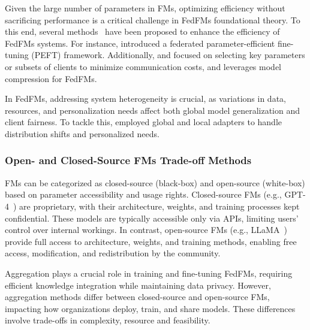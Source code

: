 Given the large number of parameters in FMs, optimizing efficiency without sacrificing performance is a critical challenge in FedFMs foundational theory. To this end, several methods~\cite{wu2024fedbiot,su2024titanic,yue2023fedjudge} have been proposed to enhance the efficiency of FedFMs systems. For instance, \citet{kuang2024federatedscope} introduced a federated parameter-efficient fine-tuning (PEFT) framework. Additionally, \citet{yue2023fedjudge} and \citet{su2024titanic} focused on selecting key parameters or subsets of clients to minimize communication costs, and \citet{wu2024fedbiot} leverages model compression for FedFMs.


In FedFMs, addressing system heterogeneity is crucial, as variations in data, resources, and personalization needs affect both global model generalization and client fairness. To tackle this, \citet{6-data-feddpa} employed global and local adapters to handle distribution shifts and personalized needs.

\subsubsection{Open- and Closed-Source FMs Trade-off Methods}

FMs can be categorized as closed-source (black-box) and open-source (white-box) based on parameter accessibility and usage rights. Closed-source FMs (e.g., GPT-4~\cite{OpenAI_GPT4_2023}) are proprietary, with their architecture, weights, and training processes kept confidential. These models are typically accessible only via APIs, limiting users' control over internal workings. In contrast, open-source FMs (e.g., LLaMA~\cite{touvron2023llama}) provide full access to architecture, weights, and training methods, enabling free access, modification, and redistribution by the community.

Aggregation plays a crucial role in training and fine-tuning FedFMs, requiring efficient knowledge integration while maintaining data privacy. However, aggregation methods differ between closed-source and open-source FMs, impacting how organizations deploy, train, and share models. These differences involve trade-offs in complexity, resource and feasibility.


